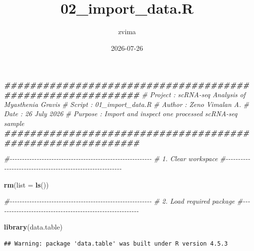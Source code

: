 \documentclass[
]{article}
\title{02\_import\_data.R}
\author{zvima}
\date{2026-07-26}
\newenvironment{Shaded}{\begin{snugshade}}{\end{snugshade}}
\newcommand{\AttributeTok}[1]{\textcolor[rgb]{0.13,0.29,0.53}{#1}}
\newcommand{\CommentTok}[1]{\textcolor[rgb]{0.56,0.35,0.01}{\textit{#1}}}
\newcommand{\DocumentationTok}[1]{\textcolor[rgb]{0.56,0.35,0.01}{\textbf{\textit{#1}}}}
\newcommand{\FunctionTok}[1]{\textcolor[rgb]{0.13,0.29,0.53}{\textbf{#1}}}
\newcommand{\NormalTok}[1]{#1}
\begin{document}
\maketitle

\begin{Shaded}
\begin{Highlighting}[]
\DocumentationTok{\#\#\#\#\#\#\#\#\#\#\#\#\#\#\#\#\#\#\#\#\#\#\#\#\#\#\#\#\#\#\#\#\#\#\#\#\#\#\#\#\#\#\#\#\#\#\#\#\#\#\#\#\#\#\#\#\#\#\#}
\CommentTok{\# Project : scRNA{-}seq Analysis of Myasthenia Gravis}
\CommentTok{\# Script  : 01\_import\_data.R}
\CommentTok{\# Author  : Zeno Vimalan A.}
\CommentTok{\# Date    : 26 July 2026}
\CommentTok{\# Purpose : Import and inspect one processed scRNA{-}seq sample}
\DocumentationTok{\#\#\#\#\#\#\#\#\#\#\#\#\#\#\#\#\#\#\#\#\#\#\#\#\#\#\#\#\#\#\#\#\#\#\#\#\#\#\#\#\#\#\#\#\#\#\#\#\#\#\#\#\#\#\#\#\#\#\#}

\CommentTok{\#{-}{-}{-}{-}{-}{-}{-}{-}{-}{-}{-}{-}{-}{-}{-}{-}{-}{-}{-}{-}{-}{-}{-}{-}{-}{-}{-}{-}{-}{-}{-}{-}{-}{-}{-}{-}{-}{-}{-}{-}{-}{-}{-}{-}{-}{-}{-}{-}{-}{-}{-}{-}{-}{-}{-}{-}{-}{-}}
\CommentTok{\# 1. Clear workspace}
\CommentTok{\#{-}{-}{-}{-}{-}{-}{-}{-}{-}{-}{-}{-}{-}{-}{-}{-}{-}{-}{-}{-}{-}{-}{-}{-}{-}{-}{-}{-}{-}{-}{-}{-}{-}{-}{-}{-}{-}{-}{-}{-}{-}{-}{-}{-}{-}{-}{-}{-}{-}{-}{-}{-}{-}{-}{-}{-}{-}{-}}

\FunctionTok{rm}\NormalTok{(}\AttributeTok{list =} \FunctionTok{ls}\NormalTok{())}

\CommentTok{\#{-}{-}{-}{-}{-}{-}{-}{-}{-}{-}{-}{-}{-}{-}{-}{-}{-}{-}{-}{-}{-}{-}{-}{-}{-}{-}{-}{-}{-}{-}{-}{-}{-}{-}{-}{-}{-}{-}{-}{-}{-}{-}{-}{-}{-}{-}{-}{-}{-}{-}{-}{-}{-}{-}{-}{-}{-}{-}}
\CommentTok{\# 2. Load required package}
\CommentTok{\#{-}{-}{-}{-}{-}{-}{-}{-}{-}{-}{-}{-}{-}{-}{-}{-}{-}{-}{-}{-}{-}{-}{-}{-}{-}{-}{-}{-}{-}{-}{-}{-}{-}{-}{-}{-}{-}{-}{-}{-}{-}{-}{-}{-}{-}{-}{-}{-}{-}{-}{-}{-}{-}{-}{-}{-}{-}{-}}

\FunctionTok{library}\NormalTok{(data.table)}
\end{Highlighting}
\end{Shaded}

\begin{verbatim}
## Warning: package 'data.table' was built under R version 4.5.3
\end{verbatim}
\end{document}
